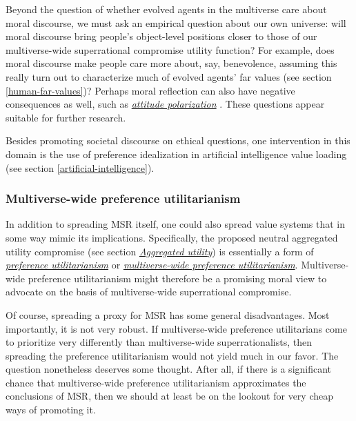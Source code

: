 Beyond the question of whether evolved agents in the multiverse care
about moral discourse, we must ask an empirical question about our own
universe: will moral discourse bring people's object-level positions
closer to those of our multiverse-wide superrational compromise utility
function? For example, does moral discourse make people care more about,
say, benevolence, assuming this really turn out to characterize much of
evolved agents' far values (see section
\ref{human-far-values})?
Perhaps moral reflection can also have negative consequences as well,
such as
\href{https://en.wikipedia.org/wiki/Group_polarization\#Attitude_polarization}{\emph{attitude
polarization}} \parencite{Lord1979-sc,Taber2006-ew}. These
questions appear suitable for further research.

Besides promoting societal discourse on ethical questions, one
intervention in this domain is the use of preference idealization in
artificial intelligence value loading (see section
\ref{artificial-intelligence}).

\hypertarget{multiverse-wide-preference-utilitarianism}{\subsubsection{Multiverse-wide
preference
utilitarianism}\label{multiverse-wide-preference-utilitarianism}}

In addition to spreading MSR itself, one could also spread value systems
that in some way mimic its implications. Specifically, the proposed
neutral aggregated utility compromise (see section
\protect\hyperlink{_2uwv44pwn55u}{\emph{Aggregated utility}}) is
essentially a form of
\href{https://foundational-research.org/hedonistic-vs-preference-utilitarianism/}{\emph{preference
utilitarianism}} or
\href{http://lesswrong.com/lw/jll/multiversewide_preference_utilitarianism/}{\emph{multiverse-wide
preference utilitarianism}}. Multiverse-wide preference utilitarianism
might therefore be a promising moral view to advocate on the basis of
multiverse-wide superrational compromise.

Of course, spreading a proxy for MSR has some general disadvantages.
Most importantly, it is not very robust. If multiverse-wide preference
utilitarians come to prioritize very differently than multiverse-wide
superrationalists, then spreading the preference utilitarianism would
not yield much in our favor. The question nonetheless deserves some
thought. After all, if there is a significant chance that
multiverse-wide preference utilitarianism approximates the conclusions
of MSR, then we should at least be on the lookout for very cheap ways of
promoting it.

